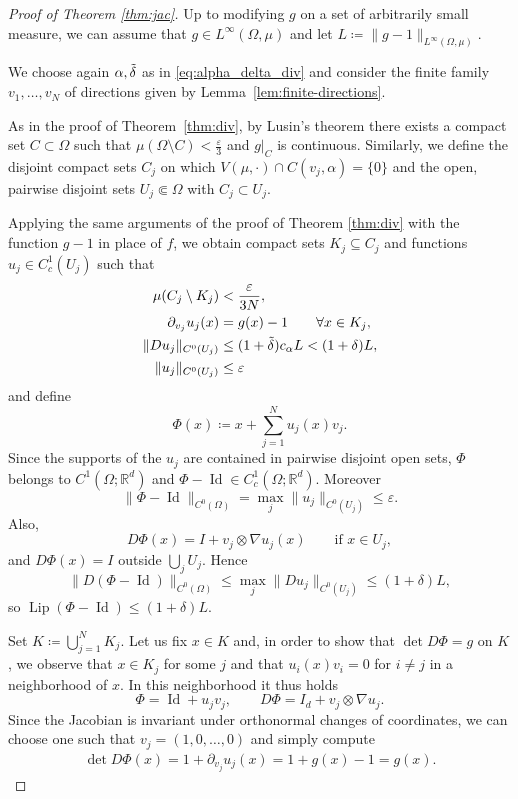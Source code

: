 \documentclass[11pt,a4paper]{article}
\newcommand{\R}{\mathbb{R}}
\newcommand{\Lip}{\operatorname{Lip}}
\newcommand{\Id}{\operatorname{Id}}
\theoremstyle{definition}
\theoremstyle{remark}
\begin{document}
\begin{proof}[Proof of Theorem \ref{thm:jac}]
Up to modifying $g$ on a set of arbitrarily small measure, we can assume that $g \in L^{\infty}(\Omega,\mu)$ and let $L \coloneqq \|g-1\|_{L^{\infty}(\Omega,\mu)}$.

We choose again $\alpha,\Tilde{\delta}$ as in \eqref{eq:alpha_delta_div} and consider the finite family $v_1,\dots,v_N$ of directions given by Lemma~\ref{lem:finite-directions}.



As in the proof of Theorem~\ref{thm:div}, by Lusin's theorem there exists a compact set $C\subset \Omega$ such that $\mu(\Omega\setminus C)<\frac{\varepsilon}{3}$ and $g|_C$ is continuous. Similarly, we define the disjoint compact sets $C_j$ on which $V(\mu,\cdot) \cap C(v_j,\alpha)=\{0\}$ and the open, pairwise disjoint sets $U_j \Subset \Omega$ with $C_j \subset U_j$.

Applying the same arguments of the proof of Theorem \ref{thm:div} with the function $g-1$ in place of $f$, we obtain compact sets $K_j \subseteq C_j$ and functions $u_j \in C_c^1(U_j)$ such that
\begin{align*}
\mu(C_j\setminus K_j)&<\frac{\varepsilon}{3N},\\
\partial_{v_j}u_j(x)&=g(x)-1\qquad \forall x\in K_j,\\
\|Du_j\|_{C^0(U_j)}&\le (1+\Tilde{\delta})c_\alpha L < (1+\delta)L,\\
\|u_j\|_{C^0(U_j)}&\le \varepsilon
\end{align*}
and define
$$
\Phi(x)\coloneqq x+\sum_{j=1}^N u_j(x)v_j.
$$
Since the supports of the $u_j$ are contained in pairwise disjoint open sets, $\Phi$ belongs to $C^1(\Omega;\R^d)$ and $\Phi-\Id\in C^1_c(\Omega;\R^d)$.
Moreover
$$
\|\Phi-\Id\|_{C^0(\Omega)}
=\max_j \|u_j\|_{C^0(U_j)}
\le \varepsilon.
$$
Also,
$$
D\Phi(x)=I+v_j\otimes \nabla u_j(x)
\qquad\text{if }x\in U_j,
$$
and $D\Phi(x)=I$ outside $\bigcup_j U_j$.
Hence
$$
\|D(\Phi -\Id) \|_{C^0(\Omega)}
\le \max_j \|Du_j\|_{C^0(U_j)}
\le (1+\delta)L,
$$
so $\Lip(\Phi- \Id)\le (1+\delta)L$.

Set $K\coloneqq \bigcup_{j=1}^N K_j$. Let us fix $x \in K$ and, in order to show that $\det D\Phi=g$ on $K$, we observe that $x \in K_j$ for some $j$ and that $u_i(x)v_i=0$ for $i \neq j$ in a neighborhood of $x$. In this neighborhood it thus holds
$$
\Phi = \operatorname{Id} + u_jv_j,
\qquad
D\Phi=I_d +v_j \otimes \nabla u_j.
$$
Since the Jacobian is invariant under orthonormal changes of coordinates, we can choose one such that $v_j=(1,0,\dots,0)$ and simply compute
$$
\begin{aligned}
\det D\Phi(x)
=
1+ \partial_{v_j} u_j(x)
=
1+g(x)-1= g(x).
\end{aligned}
$$


\end{proof}
\end{document}
